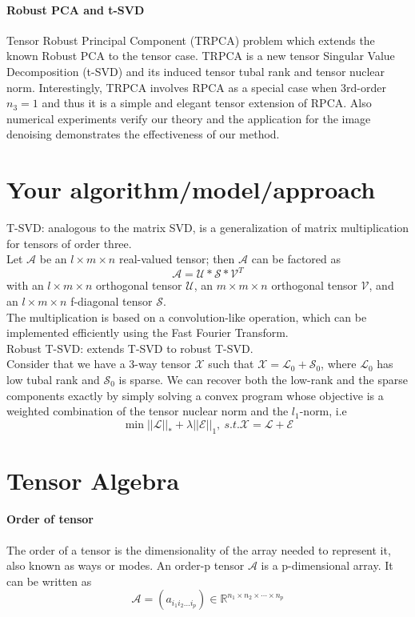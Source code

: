 \documentclass[english]{article}
\newcommand{\<}{\langle}
\renewcommand{\>}{\rangle}
\theoremstyle{definition}
\begin{document}
\paragraph{Robust PCA and t-SVD} Tensor Robust Principal Component (TRPCA)\cite{lu2016tensor} problem which extends the known Robust PCA \cite{candes2011robust} to the tensor case. TRPCA is a new tensor Singular Value Decomposition (t-SVD) \cite{kilmer2011factorization} and its induced tensor tubal rank and tensor nuclear norm. Interestingly, TRPCA involves RPCA as a special case when 3rd-order $n_3 = 1$ and thus it is a simple and elegant tensor extension of RPCA. Also numerical experiments verify our theory and the application for the image denoising demonstrates the effectiveness of our method. 

\section{Your algorithm/model/approach}
T-SVD: analogous to the matrix SVD, is a generalization of matrix multiplication for tensors of order three.\\
Let $ \mathcal A $ be an $ l\times m \times n $ real-valued tensor; then $ \mathcal A $ can be factored as 
$$ \mathcal A=\mathcal U*\mathcal S*\mathcal V^{T} $$
with an $ l\times m \times n $ orthogonal tensor $ \mathcal U $, an $ m\times m \times n $ orthogonal tensor $ \mathcal V $, and an $ l\times m \times n $ f-diagonal tensor $ \mathcal S $.\\
The multiplication is based on a convolution-like operation, which can be implemented efficiently using the Fast Fourier Transform.\\
Robust T-SVD: extends T-SVD to robust T-SVD.\\
Consider that we have a 3-way tensor $ \mathcal X $ such that $ \mathcal X=\mathcal L_{0}+\mathcal S_{0} $, where $ \mathcal L_0 $ has low tubal rank and $ \mathcal S_0 $ is sparse. We can recover both the low-rank and the sparse components exactly by simply solving a convex program whose objective is a weighted combination of the tensor nuclear norm and the $l_1$-norm, i.e
$$ \min ||\mathcal L ||_{*}+\lambda||\mathcal E||_{1}, \ s.t. \mathcal X=\mathcal L+\mathcal E $$

\section{Tensor Algebra}
\paragraph{Order of tensor} The order of a tensor is the dimensionality of the array needed to represent it, also known as ways or modes. 
An order-p  tensor  $\mathcal{A}$  is a  p-dimensional array. It can be written as
$$\mathcal{A}=\left(a_{i_{1} i_{2} \ldots i_{p}}\right) \in \mathbb{R}^{n_{1} \times n_{2} \times \cdots \times n_{p}}$$
\end{document}
